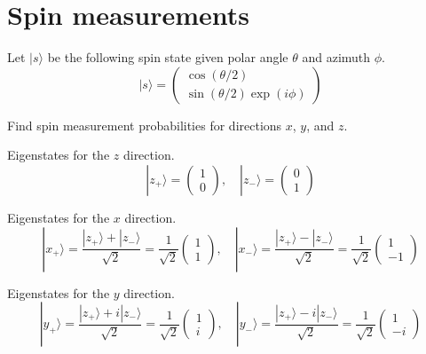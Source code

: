 

\section*{Spin measurements}

Let $|s\rangle$ be the following spin state given polar angle $\theta$ and azimuth $\phi$.
\begin{equation*}
|s\rangle=\begin{pmatrix}
\cos(\theta/2)
\\
\sin(\theta/2)\exp(i\phi)
\end{pmatrix}
\end{equation*}

Find spin measurement probabilities for directions $x$, $y$, and $z$.

\bigskip
Eigenstates for the $z$ direction.
\begin{equation*}
|z_+\rangle=\begin{pmatrix}1\\0\end{pmatrix},
\quad
|z_-\rangle=\begin{pmatrix}0\\1\end{pmatrix}
\end{equation*}

Eigenstates for the $x$ direction.
\begin{equation*}
|x_+\rangle=\frac{|z_+\rangle+|z_-\rangle}{\sqrt2}=\frac{1}{\sqrt2}\begin{pmatrix}1\\1\end{pmatrix},
\quad
|x_-\rangle=\frac{|z_+\rangle-|z_-\rangle}{\sqrt2}=\frac{1}{\sqrt2}\begin{pmatrix}1\\-1\end{pmatrix}
\end{equation*}

Eigenstates for the $y$ direction.
\begin{equation*}
|y_+\rangle=\frac{|z_+\rangle+i|z_-\rangle}{\sqrt2}=\frac{1}{\sqrt2}\begin{pmatrix}1\\i\end{pmatrix},
\quad
|y_-\rangle=\frac{|z_+\rangle-i|z_-\rangle}{\sqrt2}=\frac{1}{\sqrt2}\begin{pmatrix}1\\-i\end{pmatrix}
\end{equation*}

